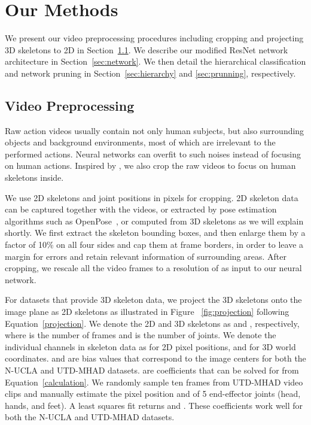 \documentclass{article}
\begin{document}
 \section{Our Methods}

{We present our video preprocessing procedures including cropping and projecting 3D skeletons to 2D in Section~\ref{sec:preprocessing}. We describe our modified ResNet network architecture in Section~\ref{sec:network}. We then detail the hierarchical classification and network pruning in Section~\ref{sec:hierarchy} and \ref{sec:prunning}, respectively.}

\subsection{Video Preprocessing}
\label{sec:preprocessing}
{Raw action videos usually contain not only human subjects, but also surrounding objects and background environments, most of which are irrelevant to the performed actions. Neural networks can overfit to such noises instead of focusing on human actions. Inspired by \cite{zhu2018action}, we also crop the raw videos to focus on human skeletons inside.}

{We use 2D skeletons and joint positions in pixels for cropping. 2D skeleton data can be captured together with the videos, or extracted by pose estimation algorithms such as OpenPose~\cite{OpenPose}, or computed from 3D skeletons as we will explain shortly. We first extract the skeleton bounding boxes, and then enlarge them by a factor of 10\% on all four sides and cap them at frame borders, in order to leave a margin for errors and retain relevant information of surrounding areas. After cropping, we rescale all the video frames to a resolution of  as input to our neural network.}

{For datasets that provide 3D skeleton data, we project the 3D skeletons onto the image plane as 2D skeletons as illustrated in Figure~ \ref{fig:projection} following Equation~\ref{projection}. We denote the 2D and 3D skeletons as  and , respectively, where  is the number of frames and  is the number of joints. We denote the individual channels in skeleton data as  for 2D pixel positions, and  for 3D world coordinates.  and  are bias values that correspond to the image centers for both the N-UCLA and UTD-MHAD datasets.  are coefficients that can be solved for from Equation~\ref{calculation}. We randomly sample ten frames from UTD-MHAD video clips and manually estimate the pixel position  and  of 5 end-effector joints (head, hands, and feet). A least squares fit returns  and . These coefficients work well for both the N-UCLA and UTD-MHAD datasets.} 
\end{document}
